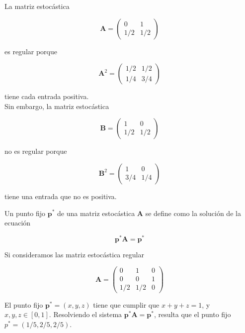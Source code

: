 \begin{ejemplo}
La matriz estocástica

\[ \mathbf{A} = \left(\begin{array}{cc}
0 & 1\\
1/2 & 1/2
\end{array}\right) \]

es regular porque 

\[ \mathbf{A}^2 = \left(\begin{array}{cc}
1/2 & 1/2\\
1/4 & 3/4
\end{array}\right) \]

tiene cada entrada positiva.\\
Sin embargo, la matriz estocástica

\[ \mathbf{B} = \left(\begin{array}{cc}
1 & 0\\
1/2 & 1/2
\end{array}\right) \]

no es regular porque

\[ \mathbf{B}^2 = \left(\begin{array}{cc}
1 & 0\\
3/4 & 1/4
\end{array}\right) \]

tiene una entrada que no es positiva.
\end{ejemplo}

\begin{defi}
Un punto fijo $\mathbf{p}^*$ de una matriz estocástica $\mathbf{A}$ se define como la solución de la ecuación

\[ \mathbf{p}^* \mathbf{A} = \mathbf{p}^* \]
\end{defi}

\begin{ejemplo}
Si consideramos las matriz estocástica regular

\[ \mathbf{A} = \left(\begin{array}{ccc}
0 & 1 & 0\\
0 & 0 & 1\\
1/2 & 1/2 & 0
\end{array}\right) \]

El punto fijo $\mathbf{p}^* = (x,y,z)$ tiene que cumplir que $x+y+z = 1$, y $x,y,z \in [0,1]$. Resolviendo el sistema $\mathbf{p}^* \mathbf{A} = \mathbf{p}^*$, resulta que el punto fijo $p^* = (1/5, 2/5, 2/5)$.
\end{ejemplo}


